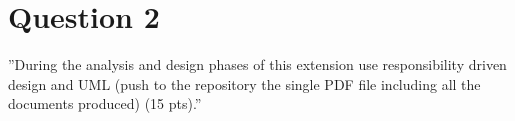 \section{Question 2}

''During the analysis and design phases of this extension use responsibility driven design and UML
(push to the repository the single PDF file including all the documents produced) (15 pts).''